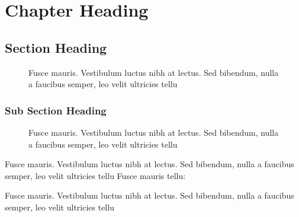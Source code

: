 \chapter{Chapter Heading}
\label{ch01:chap01}



\lipsum[5]

\section{Section Heading}
\label{ch01:sec3.1}

\lipsum[5]

\begin{figure}
{}
\caption{Fusce mauris. Vestibulum luctus nibh at lectus. Sed bibendum, nulla a faucibus semper, leo velit
ultricies tellu}
\end{figure}

\subsection{Sub Section Heading}
\label{ch01:sec3.1.1}

\lipsum[5]

\begin{figure}
{\hspace*{-3pc}}
{\hspace*{-3pc}\begin{minipage}{33pc}
\caption{Fusce mauris. Vestibulum luctus nibh at lectus. Sed bibendum, nulla a faucibus semper, leo velit
ultricies tellu}
\end{minipage}}
\end{figure}

Fusce mauris. Vestibulum luctus nibh at lectus. Sed bibendum, nulla a faucibus semper, leo velit
ultricies tellu\cite{Hastie_Tibshirani} Fusce mauris tellu:

\begin{example}{\label{ch01:exa3.1}}
\lipsum[5]

\solution \lipsum[5]
\lipsum[5]

\begin{nboxfig}
{}
{Fusce mauris. Vestibulum luctus nibh at lectus. Sed bibendum, nulla a faucibus semper, leo velit
ultricies tellu}
\end{nboxfig}
\end{example}

